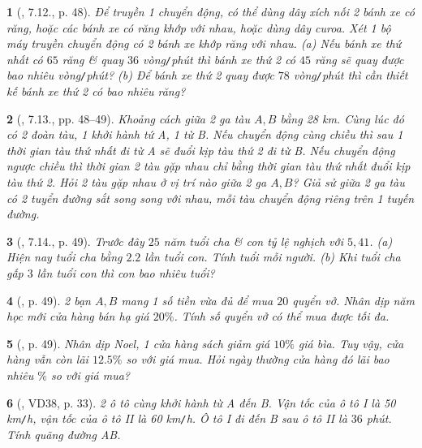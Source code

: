 \documentclass{article}
\newtheorem{baitoan}{}
\begin{document}
\begin{baitoan}[\cite{Binh_boi_duong_Toan_7_tap_1}, 7.12., p. 48]
	Để truyền 1 chuyển động, có thể dùng dây xích nối 2 bánh xe có răng, hoặc các bánh xe có răng khớp với nhau, hoặc dùng dây curoa. Xét 1 bộ máy truyền chuyển động có 2 bánh xe khớp răng với nhau. (a) Nếu bánh xe thứ nhất có $65$ răng \& quay $36$ vòng{\tt/}phút thì bánh xe thứ 2 có $45$ răng sẽ quay được bao nhiêu vòng{\tt/}phút? (b) Để bánh xe thứ 2 quay được $78$ vòng{\tt/}phút thì cần thiết kế bánh xe thứ 2 có bao nhiêu răng?
\end{baitoan}

\begin{baitoan}[\cite{Binh_boi_duong_Toan_7_tap_1}, 7.13., pp. 48--49]
	Khoảng cách giữa 2 ga tàu $A,B$ bằng {\rm28 km}. Cùng lúc đó có 2 đoàn tàu, 1 khởi hành tứ A, 1 từ B. Nếu chuyển động cùng chiều thì sau 1 thời gian tàu thứ nhất đi từ A sẽ đuổi kịp tàu thứ 2 đi từ B. Nếu chuyển động ngược chiều thì thời gian 2 tàu gặp nhau chỉ bằng thời gian tàu thứ nhất đuổi kịp tàu thứ 2. Hỏi 2 tàu gặp nhau ở vị trí nào giữa 2 ga $A,B$? Giả sử giữa 2 ga tàu có 2 tuyển đường sắt song song với nhau, mỗi tàu chuyển động riêng trên 1 tuyến đường.
\end{baitoan}

\begin{baitoan}[\cite{Binh_boi_duong_Toan_7_tap_1}, 7.14., p. 49]
	Trước đây $25$ năm tuổi cha \& con tỷ lệ nghịch với $5,41$. (a) Hiện nay tuổi cha bằng $2.2$ lần tuổi con. Tính tuổi mỗi người. (b) Khi tuổi cha gấp $3$ lần tuổi con thì con bao nhiêu tuổi?
\end{baitoan}

\begin{baitoan}[\cite{Binh_boi_duong_Toan_7_tap_1}, p. 49]
	2 bạn $A,B$ mang 1 số tiền vừa đủ để mua $20$ quyển vở. Nhân dịp năm học mới cửa hàng bán hạ giá $20\%$. Tính số quyển vở có thể mua được tối đa.
\end{baitoan}

\begin{baitoan}[\cite{Binh_boi_duong_Toan_7_tap_1}, p. 49]
	Nhân dịp Noel, 1 cửa hàng sách giảm giá $10\%$ giá bìa. Tuy vậy, cửa hàng vẫn còn lãi $12.5\%$ so với giá mua. Hỏi ngày thường cửa hàng đó lãi bao nhiêu $\%$ so với giá mua?
\end{baitoan}

\begin{baitoan}[\cite{Tuyen_Toan_7}, VD38, p. 33]
	2 ô tô cùng khởi hành từ A đến B. Vận tốc của ô tô I là {\rm50 km{\tt/}h}, vận tốc của ô tô II là {\rm60 km{\tt/}h}. Ô tô I đi đến B sau ô tô II là $36$ phút. Tính quãng đường AB.
\end{baitoan}
\end{document}
